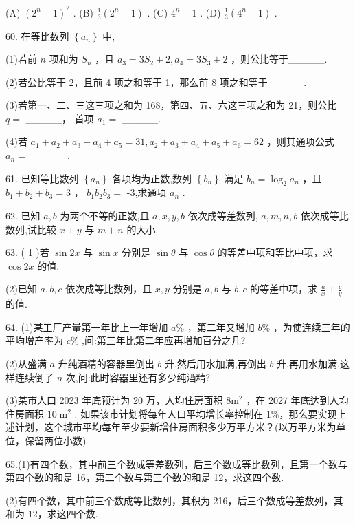 \documentclass[10pt]{article}
\begin{document}
(A) \({\left( {2}^{n} - 1\right) }^{2}\) . (B) \(\frac{1}{3}\left( {{2}^{n} - 1}\right)\) . (C) \({4}^{n} - 1\) . (D) \(\frac{1}{3}\left( {{4}^{n} - 1}\right)\) .

60. 在等比数列 \(\left\{  {a}_{n}\right\}\) 中,

(1)若前 \(n\) 项和为 \({S}_{n}\) ，且 \({a}_{3} = 3{S}_{2} + 2,{a}_{4} = 3{S}_{3} + 2\) ，则公比等于\_\_\_\_\_.

(2)若公比等于 2，且前 4 项之和等于 1，那么前 8 项之和等于\_\_\_\_\_.

(3)若第一、二、三这三项之和为 168，第四、五、六这三项之和为 21，则公比 \(q =\) \_\_\_\_\_， 首项 \({a}_{1} =\) \_\_\_\_\_.

(4)若 \({a}_{1} + {a}_{2} + {a}_{3} + {a}_{4} + {a}_{5} = {31},{a}_{2} + {a}_{3} + {a}_{4} + {a}_{5} + {a}_{6} = {62}\) ，则其通项公式 \({a}_{n} =\) \_\_\_\_\_.

61. 已知等比数列 \(\left\{  {a}_{n}\right\}\) 各项均为正数,数列 \(\left\{  {b}_{n}\right\}\) 满足 \({b}_{n} = {\log }_{2}{a}_{n}\) ，且 \({b}_{1} + {b}_{2} + {b}_{3} = 3\) ， \({b}_{1}{b}_{2}{b}_{3} =\) -3,求通项 \({a}_{n}\) .

62. 已知 \(a,b\) 为两个不等的正数,且 \(a,x,y,b\) 依次成等差数列, \(a,m,n,b\) 依次成等比数列,试比较 \(x + y\) 与 \(m + n\) 的大小.

63. ( 1 )若 \(\sin {2x}\) 与 \(\sin x\) 分别是 \(\sin \theta\) 与 \(\cos \theta\) 的等差中项和等比中项，求 \(\cos {2x}\) 的值.

(2)已知 \(a,b,c\) 依次成等比数列，且 \(x,y\) 分别是 \(a,b\) 与 \(b,c\) 的等差中项，求 \(\frac{a}{x} + \frac{c}{y}\) 的值.

64. (1)某工厂产量第一年比上一年增加 \(a\%\) ，第二年又增加 \(b\%\) ，为使连续三年的平均增产率为 \(c\%\) ,问:第三年比第二年应再增加百分之几?

(2)从盛满 \(a\) 升纯酒精的容器里倒出 \(b\) 升,然后用水加满,再倒出 \(b\) 升,再用水加满,这样连续倒了 \(n\) 次,问:此时容器里还有多少纯酒精?

(3)某市人口 2023 年底预计为 20 万，人均住房面积 \(8{\mathrm{m}}^{2}\) ，在 2027 年底达到人均住房面积 \({10}{\mathrm{\;m}}^{2}\) . 如果该市计划将每年人口平均增长率控制在 1\%，那么要实现上述计划，这个城市平均每年至少要新增住房面积多少万平方米？(以万平方米为单位，保留两位小数)

65.(1)有四个数，其中前三个数成等差数列，后三个数成等比数列，且第一个数与第四个数的和是 16，第二个数与第三个数的和是 12，求这四个数.

(2)有四个数，其中前三个数成等比数列，其积为 216，后三个数成等差数列，其和为 12，求这四个数.
\end{document}
